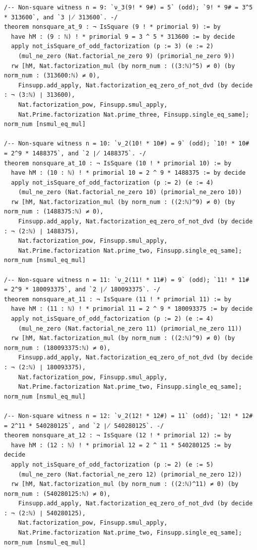 \documentclass[11pt]{article}
\theoremstyle{definition}
\begin{document}
\begin{lstlisting}
/-- Non-square witness n = 9: `ν_3(9! * 9#) = 5` (odd); `9! * 9# = 3^5 * 313600`, and `3 ∤ 313600`. -/
theorem nonsquare_at_9 : ¬ IsSquare (9 ! * primorial 9) := by
  have hM : (9 : ℕ) ! * primorial 9 = 3 ^ 5 * 313600 := by decide
  apply not_isSquare_of_odd_factorization (p := 3) (e := 2)
    (mul_ne_zero (Nat.factorial_ne_zero 9) (primorial_ne_zero 9))
  rw [hM, Nat.factorization_mul (by norm_num : ((3:ℕ)^5) ≠ 0) (by norm_num : (313600:ℕ) ≠ 0),
    Finsupp.add_apply, Nat.factorization_eq_zero_of_not_dvd (by decide : ¬ (3:ℕ) ∣ 313600),
    Nat.factorization_pow, Finsupp.smul_apply,
    Nat.Prime.factorization Nat.prime_three, Finsupp.single_eq_same]; norm_num [nsmul_eq_mul]

/-- Non-square witness n = 10: `ν_2(10! * 10#) = 9` (odd); `10! * 10# = 2^9 * 1488375`, and `2 ∤ 1488375`. -/
theorem nonsquare_at_10 : ¬ IsSquare (10 ! * primorial 10) := by
  have hM : (10 : ℕ) ! * primorial 10 = 2 ^ 9 * 1488375 := by decide
  apply not_isSquare_of_odd_factorization (p := 2) (e := 4)
    (mul_ne_zero (Nat.factorial_ne_zero 10) (primorial_ne_zero 10))
  rw [hM, Nat.factorization_mul (by norm_num : ((2:ℕ)^9) ≠ 0) (by norm_num : (1488375:ℕ) ≠ 0),
    Finsupp.add_apply, Nat.factorization_eq_zero_of_not_dvd (by decide : ¬ (2:ℕ) ∣ 1488375),
    Nat.factorization_pow, Finsupp.smul_apply,
    Nat.Prime.factorization Nat.prime_two, Finsupp.single_eq_same]; norm_num [nsmul_eq_mul]

/-- Non-square witness n = 11: `ν_2(11! * 11#) = 9` (odd); `11! * 11# = 2^9 * 180093375`, and `2 ∤ 180093375`. -/
theorem nonsquare_at_11 : ¬ IsSquare (11 ! * primorial 11) := by
  have hM : (11 : ℕ) ! * primorial 11 = 2 ^ 9 * 180093375 := by decide
  apply not_isSquare_of_odd_factorization (p := 2) (e := 4)
    (mul_ne_zero (Nat.factorial_ne_zero 11) (primorial_ne_zero 11))
  rw [hM, Nat.factorization_mul (by norm_num : ((2:ℕ)^9) ≠ 0) (by norm_num : (180093375:ℕ) ≠ 0),
    Finsupp.add_apply, Nat.factorization_eq_zero_of_not_dvd (by decide : ¬ (2:ℕ) ∣ 180093375),
    Nat.factorization_pow, Finsupp.smul_apply,
    Nat.Prime.factorization Nat.prime_two, Finsupp.single_eq_same]; norm_num [nsmul_eq_mul]

/-- Non-square witness n = 12: `ν_2(12! * 12#) = 11` (odd); `12! * 12# = 2^11 * 540280125`, and `2 ∤ 540280125`. -/
theorem nonsquare_at_12 : ¬ IsSquare (12 ! * primorial 12) := by
  have hM : (12 : ℕ) ! * primorial 12 = 2 ^ 11 * 540280125 := by decide
  apply not_isSquare_of_odd_factorization (p := 2) (e := 5)
    (mul_ne_zero (Nat.factorial_ne_zero 12) (primorial_ne_zero 12))
  rw [hM, Nat.factorization_mul (by norm_num : ((2:ℕ)^11) ≠ 0) (by norm_num : (540280125:ℕ) ≠ 0),
    Finsupp.add_apply, Nat.factorization_eq_zero_of_not_dvd (by decide : ¬ (2:ℕ) ∣ 540280125),
    Nat.factorization_pow, Finsupp.smul_apply,
    Nat.Prime.factorization Nat.prime_two, Finsupp.single_eq_same]; norm_num [nsmul_eq_mul]


\end{lstlisting}
\end{document}
